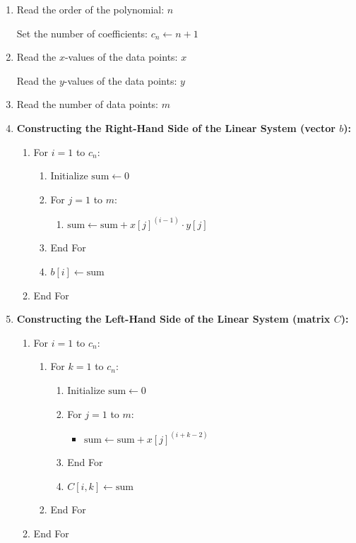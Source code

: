 \documentclass[a4paper,12pt]{article}
\begin{document}
\begin{enumerate}
	\item Read the order of the polynomial: \( n \)
	
	Set the number of coefficients: \( c_n \leftarrow n + 1 \)
	
	\item Read the \( x \)-values of the data points: \( x \)
	
	Read the \( y \)-values of the data points: \( y \)
	
	\item Read the number of data points: \( m \)
	
	\item \textbf{Constructing the Right-Hand Side of the Linear System (vector \( b \)):}
	
	\begin{enumerate}
		\item For \( i = 1 \) to \( c_n \):
		\begin{enumerate}
			\item Initialize \( \text{sum} \leftarrow 0 \)
			\item For \( j = 1 \) to \( m \):
			\begin{enumerate}
				\item \( \text{sum} \leftarrow \text{sum} + x[j]^{(i - 1)} \cdot y[j] \)
			\end{enumerate}
			\item End For
			\item \( b[i] \leftarrow \text{sum} \)
		\end{enumerate}
		\item End For
	\end{enumerate}
	
	\item \textbf{Constructing the Left-Hand Side of the Linear System (matrix \( C \)):}
	
	\begin{enumerate}
		\item For \( i = 1 \) to \( c_n \):
		\begin{enumerate}
			\item For \( k = 1 \) to \( c_n \):
			\begin{enumerate}
				\item Initialize \( \text{sum} \leftarrow 0 \)
				\item For \( j = 1 \) to \( m \):
				\begin{itemize}
					\item \( \text{sum} \leftarrow \text{sum} + x[j]^{(i + k - 2)} \)
				\end{itemize}
				\item End For
				\item \( C[i, k] \leftarrow \text{sum} \)
			\end{enumerate}
			\item End For
		\end{enumerate}
		\item End For
	\end{enumerate}
	

\end{enumerate}
\end{document}
